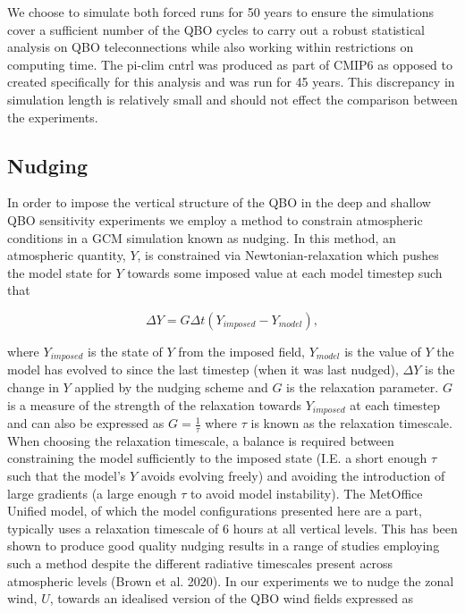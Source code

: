 We choose to simulate both forced runs for 50 years to ensure the simulations cover a sufficient number of the QBO cycles to carry out a robust statistical analysis on QBO teleconnections while also working within restrictions on computing time. The pi-clim cntrl was produced as part of CMIP6 as opposed to created specifically for this analysis and was run for 45 years. This discrepancy in simulation length is relatively small and should not effect the comparison between the experiments. 



\subsection{Nudging}
In order to impose the vertical structure of the QBO in the deep and shallow QBO sensitivity experiments we employ a method to constrain atmospheric conditions in a GCM simulation known as nudging. In this method, an atmospheric quantity, $Y$, is constrained via Newtonian-relaxation which pushes the model state for $Y$ towards some imposed value at each model timestep such that

\begin{equation} \label{eq:nudging}
\Delta Y = G \Delta t (Y_{imposed} - Y_{model}), 
\end{equation}

where $Y_{imposed}$ is the state of $Y$ from the imposed field, $Y_{model}$ is the value of $Y$ the model has evolved to since the last timestep (when it was last nudged), $\Delta Y$ is the change in $Y$ applied by the nudging scheme and $G$ is the relaxation parameter. $G$ is a measure of the strength of the relaxation towards $Y_{imposed}$ at each timestep and can also be expressed as $G = \frac{1}{\tau}$ where $\tau$ is known as the relaxation timescale. When choosing the relaxation timescale, a balance is required between constraining the model sufficiently to the imposed state (I.E. a short enough $\tau$ such that the model's $Y$ avoids evolving freely) and avoiding the introduction of large gradients (a large enough $\tau$ to avoid model instability). The MetOffice Unified model, of which the model configurations presented here are a part, typically uses a relaxation timescale of 6 hours at all vertical levels. This has been shown to produce good quality nudging results in a range of studies employing such a method despite the different radiative timescales present across atmospheric levels (Brown et al. 2020). In our experiments we to nudge the zonal wind, $U$, towards an idealised version of the QBO wind fields expressed as 

